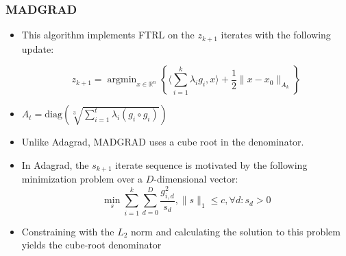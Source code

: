\documentclass{beamer}
\newcommand{\R}{\mathbb{R}}
\newcommand{\argmin}{\mathop{\text{argmin}}}
\newcommand{\diag}{\text{diag}}
\begin{document}
\begin{frame}[shrink=10]
  \frametitle{MADGRAD}

  \begin{itemize}
    \item This algorithm implements FTRL on the $z_{k+1}$ iterates with the following update:

      \[
        z_{k+1} = \argmin_{x \in \R^n}\left\{\langle \sum\limits_{i=1}^{k}\lambda_i g_i, x \rangle + \frac{1}{2}\|x
        - x_0\|_{A_k}\right\}
      \]

    \item $A_t = \diag\left(\sqrt[3]{\sum\limits_{i=1}^{t} \lambda_i (g_{i} \circ g_i)}\right)$
    \item Unlike Adagrad\cite{duchi_adaptive_nodate}, MADGRAD uses a cube root in the denominator. 
    \item In Adagrad, the $s_{k+1}$ iterate sequence is motivated by the following minimization problem over a $D$-dimensional vector:
      \[
        \min_{s} \sum\limits_{i=1}^k\sum\limits_{d=0}^D \frac{g_{i,d}^2}{s_{d}}, \|s\|_1 \leq c, \forall d: s_d > 0
      \]
    \item Constraining with the $L_2$ norm and calculating the solution to this problem yields the cube-root denominator
  \end{itemize}
\end{frame}
\end{document}
